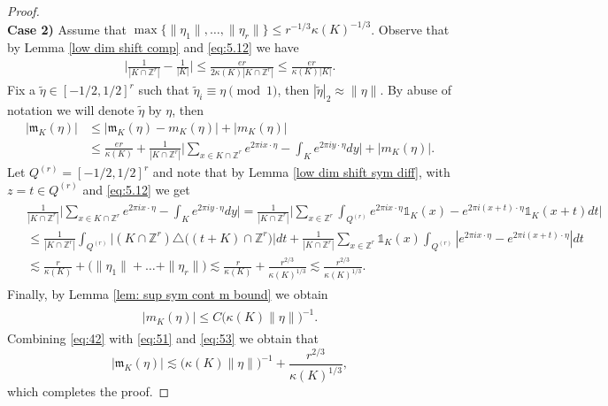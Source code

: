 \documentclass[a4paper,oneside, reqno]{amsart}
\numberwithin{equation}{section}
\theoremstyle{definition}%
\theoremstyle{definition}
\theoremstyle{definition}%
\theoremstyle{definition}
\newcommand{\Z}{\mathbb{Z}}
\begin{document}
\begin{proof}
\begin{equation*}
\end{equation*}
\textbf{Case 2)} Assume that
$\max\{\|\eta_1\|,\ldots,\|\eta_r\|\} \le r^{-1/3} \kappa(K)^{-1/3}$.  Observe that
by Lemma \ref{low dim shift comp} and \eqref{eq:5.12} we have
\begin{align*}
  \bigg| \frac{1}{|K\cap\Z^r|}-
  \frac{1}{|K|}\bigg|\le\frac{er}{2 \kappa(K)|K\cap\Z^r|}
  \le\frac{er}{\kappa(K)|K|}.
\end{align*}
Fix a $\widetilde{ \eta} \in [-1/2,1/2]^r$ such that 
$\widetilde{\eta}_i \equiv \eta \pmod{1}$, then $|\widetilde{\eta}|_2 \approx \| \eta \|$. By abuse of notation we will denote $\widetilde{\eta}$ by $\eta$, then
\begin{equation}
\label{eq:42}
  \begin{split}
  |\mathfrak m_K(\eta)|&\le\Big|\mathfrak
  m_K(\eta)-m_K(\eta)\Big|+\big|m_K(\eta)\big|\\
  &\le\frac{er}{\kappa(K)}+\frac{1}{|K\cap\Z^r|}\Big|\sum_{x\in
  K\cap\Z^r}e^{2\pi i
  x\cdot\eta}-\int_{K}e^{2\pi i
  y\cdot\eta}d y\Big|+\big|m_K(\eta)\big|.
  \end{split}
\end{equation}
Let $Q^{(r)}=[-1/2, 1/2]^r$ and note that by Lemma \ref{low dim shift sym diff}, with
$z=t\in Q^{(r)}$ and \eqref{eq:5.12} we get
\begin{align}
  \label{eq:51}
  \begin{split}
  &\frac{1}{|K\cap\Z^r|}\Big|\sum_{x\in
  K\cap\Z^r}e^{2\pi i
  x\cdot\eta}-\int_{K}e^{2\pi i
  y\cdot\eta}d y\Big|=\frac{1}{|K\cap\Z^r|}\Big|\sum_{x\in
  \Z^r}\int_{Q^{(r)}}e^{2\pi i
  x\cdot\eta}\mathds{1}_{K}(x)-e^{2\pi i
  (x+t)\cdot\eta}\mathds{1}_{K}(x+t)d t\Big|\\
&\le\frac{1}{|K\cap\Z^r|}\int_{Q^{(r)}}\big|(K\cap\Z^r)\triangle\big((t+K)\cap\Z^r\big)\big|d
t+
  \frac{1}{|K\cap\Z^r|}\sum_{x\in
  \Z^r}\mathds{1}_{K}(x)\int_{Q^{(r)}}|e^{2\pi i
  x\cdot\eta}-e^{2\pi i
  (x+t)\cdot\eta}|d t\\
& \lesssim \frac{r}{\kappa(K)}+\big(\|\eta_1\|+\ldots+\|\eta_r\|\big) \lesssim  \frac{r}{\kappa(K)}+ \frac{r^{2/3}}{\kappa(K)^{1/3}} \lesssim \frac{r^{2/3}}{\kappa(K)^{1/3}}.
  \end{split}
\end{align}
Finally, by Lemma \ref{lem: sup sym cont m bound}  we obtain
\begin{align}
  \label{eq:53}
  \begin{split}
  \big| m_K(\eta)\big|\le  C\big(\kappa(K)\|\eta\|\big)^{-1}.
  \end{split}
\end{align}
Combining \eqref{eq:42} with \eqref{eq:51} and \eqref{eq:53} we obtain
 that
\[
|\mathfrak m_K(\eta)|\lesssim \big(\kappa(K)\|\eta\|\big)^{-1}+ \frac{r^{2/3}}{\kappa(K)^{1/3}},
\]
which completes the proof.
\end{proof}
\end{document}
